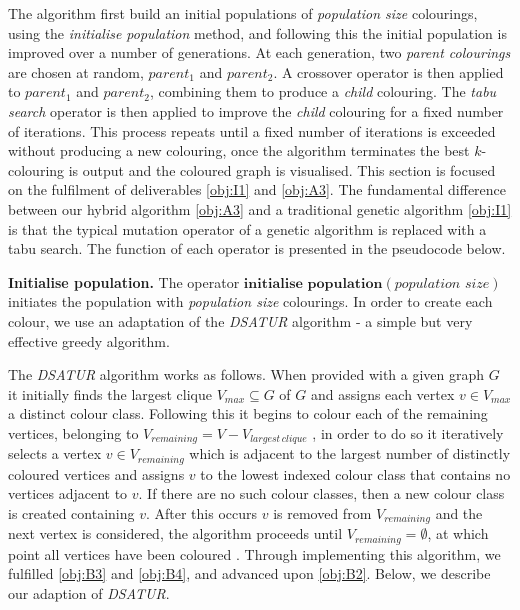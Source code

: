 \documentclass[12pt,a4paper]{article}
\begin{document}
 The algorithm first build an initial populations of \textit{population size} colourings, using the \textit{initialise population} method, and following this the initial population is improved over a number of generations. At each generation, two \textit{parent colourings} are chosen at random, $parent_1$ and $parent_2$. A crossover operator is then applied to $parent_1$ and $parent_2$, combining them to produce a \textit{child} colouring. The \textit{tabu search} operator is then applied to improve the \textit{child} colouring for a fixed number of iterations. This process repeats until a fixed number of iterations is exceeded without producing a new colouring, once the algorithm terminates the best $k$-colouring is output and the coloured graph is visualised. This section is focused on the fulfilment of deliverables \ref{obj:I1} and \ref{obj:A3}. The fundamental difference between our hybrid algorithm \ref{obj:A3} and a traditional genetic algorithm \ref{obj:I1} is that the typical mutation operator of a genetic algorithm is replaced with a tabu search. The function of each operator is presented in the pseudocode below.
\par \textbf{Initialise population.} The operator $\textbf{initialise population}(\textit{population size})$ initiates the population with \textit{population size} colourings. In order to create each colour, we use an adaptation of the \textit{DSATUR} algorithm \cite{Brelaz} - a simple but very effective greedy algorithm.
\par The \textit{DSATUR} algorithm works as follows. When provided with a given graph $G$ it initially finds the largest clique $V_{max} \subseteq G$ of $G$ and assigns each vertex $v \in V_{max}$ a distinct colour class. Following this it begins to colour each of the remaining vertices, belonging to $V_{remaining} = V - V_{largest \, clique}$ , in order to do so it iteratively selects a vertex $v \in V_{remaining}$ which is adjacent to the largest number of distinctly coloured vertices and assigns $v$ to the lowest indexed colour class that contains no vertices adjacent to $v$. If there are no such colour classes, then a new colour class is created containing $v$. After this occurs $v$ is removed from $V_{remaining}$ and the next vertex is considered, the algorithm proceeds until $V_{remaining} = \emptyset$, at which point all vertices have been coloured \cite{Brelaz}.  Through implementing this algorithm, we fulfilled \ref{obj:B3} and \ref{obj:B4}, and advanced upon \ref{obj:B2}. Below, we describe our adaption of \textit{DSATUR}.
\end{document}
